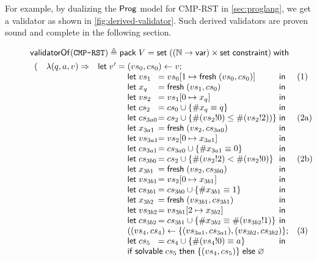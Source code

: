 For example, by dualizing the $\mathsf{Prog}$ model for CMP-RST in
\autoref{sec:proglang}, we get a validator as shown in
\autoref{fig:derived-validator}.  Such derived validators are proven sound and
complete in the following section.
\begin{figure}
\begin{align*}
&\validatorOf(\texttt{CMP-RST})\triangleq\existT{V}{\Set((\Nat\to\Var)\times\Set\constraint)}\\
  &\begin{array}{rll}
     (&\lam{(q,a,v)}{&\llet v'=\begin{array}[t]{@{}l@{}l@{}ll}
       \multicolumn{3}{@{}l}{(vs_0,cs_0)\gets v;}\\
       \letin{vs_1&}{\update{vs_0}{1}{\Fresh (vs_0,cs_0)}&}&\text{(1)}\\
       \letin{x_q&}{\Fresh (vs_1,cs_0)&}\\
       \letin{vs_2&}{\update{vs_1}{0}{x_q}&}\\
       \letin{cs_2&}{cs_0\cup\{\#x_q\equiv q\}&}\\
       \letin{cs_{3a0}&}{cs_2\cup\{\#(vs_2!0)\le\#(vs_2!2))\}&}&\text{(2a)}\\
       \letin{x_{3a1}&}{\Fresh (vs_2,cs_{3a0})&}\\
       \letin{vs_{3a1}&}{\update{vs_2}{0}{x_{3a1}}&}\\
       \letin{cs_{3a1}&}{cs_{3a0}\cup\{\#x_{3a1}\equiv0\}&}\\
       \letin{cs_{3b0}&}{cs_2\cup\{\#(vs_2!2)<\#(vs_2!0)\}&}&\text{(2b)}\\
       \letin{x_{3b1}&}{\Fresh (vs_2,cs_{3b0})&}\\
       \letin{vs_{3b1}&}{\update{vs_2}{0}{x_{3b1}}&}\\
       \letin{cs_{3b1}&}{cs_{3b0}\cup\{\#x_{3b1}\equiv1\}&}\\
       \letin{x_{3b2}&}{\Fresh (vs_{3b1},cs_{3b1})&}\\
       \letin{vs_{3b2}&}{\update{vs_{3b1}}{2}{x_{3b2}}&}\\
       \letin{cs_{3b2}&}{cs_{3b1}\cup\{\#x_{3b2}\equiv\#(vs_{3b2}!1)\}&}\\
       \multicolumn{3}{@{}l}{((vs_4,cs_4)\gets\{(vs_{3a1},cs_{3a1}),(vs_{3b2},cs_{3b2})\};}&\text{(3)}\\
       \letin{cs_5&}{cs_4\cup\{\#(vs_4!0)\equiv a\}&}\\
       \multicolumn{3}{@{}l}{\If\solvable cs_5\Then\{(vs_4,cs_5)\}\Else\varnothing}\\
       \end{array}\\
}
\end{array}
\end{align*}
\end{figure}
